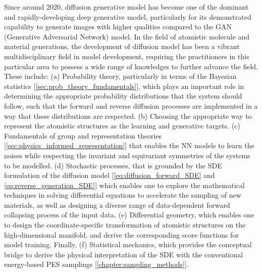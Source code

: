 Since around 2020, diffusion generative model\cite{ho2020denoising} has become one of the dominant and rapidly-developing deep generative model, particularly for its demonstrated capability to generate images with higher qualities compared to the GAN (Generative Adversarial Network) model.\cite{dhariwal2021diffusion} In the field of atomistic molecule and material generations, the development of diffusion model has been a vibrant multidisciplinary field in model development, requiring the practitioners in this particular area to possess a wide range of knowledges to further advance the field. These include: (a) Probability theory, particularly in terms of the Bayesian statistics [\cref{sec:prob_theory_fundamentals}], which plays an important role in determining the appropriate probability distributions that the system should follow, such that the forward and reverse diffusion processes are implemented in a way that these distributions are respected. (b) Choosing the appropriate way to represent the atomistic structures as the learning and generative targets. (c) Fundamentals of group and representation theories [\cref{sec:physics_informed_representation}] that enables the NN models to learn the noises while respecting the invariant and equivariant symmetries of the systems to be modelled. (d) Stochastic processes, that is grounded by the SDE formulation of the diffusion model [\cref{eq:diffusion_forward_SDE} and \cref{eq:reverse_generation_SDE}] which enables one to explore \cite{song2020score,song2020denoising} the mathematical techniques in solving differential equations to accelerate the sampling of new materials, as well as designing a diverse range of data-dependent forward collapsing process of the input data.\cite{cornet2024equivariant} (e) Differential geometry, which enables one to design the coordinate-specific transformation of atomistic structures on the high-dimensional manifold, and derive the corresponding score functions for model training. Finally, (f) Statistical mechanics, which provides the conceptual bridge to derive the physical interpretation of the SDE with the conventional energy-based PES samplings [\cref{chapter:sampling_methods}].

